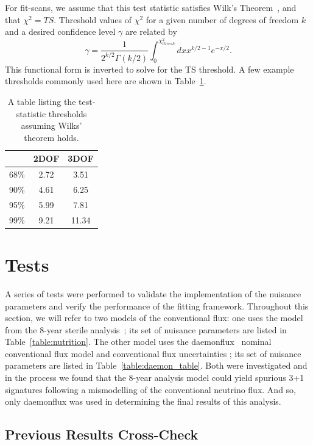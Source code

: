 \documentclass[main.tex]{subfiles}
\begin{document}
For fit-scans, we assume that this test statistic satisfies Wilk's Theorem~\cite{10.1214/aoms/1177732360}, and that $\chi^{2}= TS$. 
Threshold values of $\chi^{2}$ for a given number of degrees of freedom $k$ and a desired confidence level $\gamma$ are related by 
\begin{equation}
    \gamma = \dfrac{1}{2^{k/2} \Gamma(k/2)} \int_{0}^{\chi^{2}_{thresh}} dx x^{k/2 - 1} e^{-x/2}. 
\end{equation}
This functional form is inverted to solve for the TS threshold. A few example thresholds commonly used here are shown in Table~\ref{table:tsthresh}.
\begin{table}
    \centering
    \begin{tabular}{c | c c}\rowcolor{blue!25}
        & 2DOF & 3DOF \\\hline
    68\% & 2.72 & 3.51 \\
    90\% & 4.61 & 6.25 \\ 
    95\% & 5.99 & 7.81 \\
    99\% & 9.21 & 11.34 
    \end{tabular}
    \caption{A table listing the test-statistic thresholds assuming Wilks' theorem holds.}\label{table:tsthresh}
\end{table}

\section{Tests}

A series of tests were performed to validate the implementation of the nuisance parameters and verify the performance of the fitting framework. 
Throughout this section, we will refer to two models of the conventional flux: one uses the model from the 8-year sterile analysis~\cite{Aartsen_2020, Aartsen_2020_prd}; its set of nuisance parameters are listed in Table~\ref{table:nutrition}.
The other model uses the daemonflux~\cite{yanez2023daemonflux} nominal conventional flux model and conventional flux uncertainties ; its set of nuisance parameters are listed in Table~\ref{table:daemon_table}. 
Both were investigated and in the process we found that the 8-year analysis model could yield spurious 3+1 signatures following a mismodelling of the conventional neutrino flux. 
And so, only daemonflux was used in determining the final results of this analysis. 

\subsection{Previous Results Cross-Check}
\end{document}
